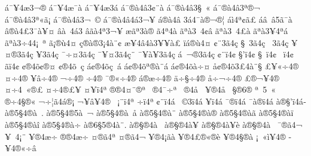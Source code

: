 {^^e1^^af^^a54^^e63^^ac^^ae^^ad
^^e1^^af^^a54^^e6^^af^^e0
^^e1^^af^^a54^^e63^^e1
^^e1^^af^^ae^^e04^^e23^^a2^^a8^^e0
^^e1^^af^^ae^^e04^^e23^^a7^^a0^^ab
^^e1^^af^^ae^^e04^^e23^^aa^^ae^^ac
^^e1^^af^^ae^^e04^^e23^^aa^^ab^^e3^^a1
^^e1^^af^^ae^^e04^^e23^^ac^^a0^^a9
^^e1^^af^^ae^^e04^^e24^^e13^^ac^^a5
^^e1^^ae^^e04^^e2^^ad
3^^e14^^af^^e0^^ae^^ac^^ae^^a6
^^e1^^ec4^^aa^^a2^^e3^^a3
^^e1^^e2^^a0^^e25^^e3^^af^^e0
^^e2^^ae^^e04^^a33^^af^^e0^^a5^^a4
^^e2^^e0^^a0^^ad4^^e13
^^e2^^e3^^e04^^aa3^^ac^^a5^^ad
^^e6^^e3^^aa3^^e0^^ae
^^e34^^aa4^^e0
^^e3^^aa^^e03^^a04^^a2^^e2
^^e3^^aa^^e03^^a04^^a3^^e0
^^e3^^aa^^e03^^a54^^aa^^e1
^^e3^^aa^^e03^^f74^^ad4^^a1^^a0^^ad^^aa 
^^e3^^a1^^ae^^f94^^a4
^^e7^^ae^^e0^^ad^^ae3^^a14^^e0^^a8^^a2
^^e6^^a5^^ad4^^e24^^e03^^a5^^ad^^a5^^e0^^a3
^^ef^^e1^^ae^^f94^^a4
^^a2^^a83^^e34^^e7
^^a7^^a03^^e34^^e7
^^ad^^a03^^e34^^e7
^^ad^^a5^^a4^^ae3^^e34^^e7
^^ad^^a53^^e34^^e7
^^af^^f7^^a43^^e34^^e7
^^af^^a5^^a43^^e34^^e7^^a8
^^af^^a5^^e0^^a53^^e34^^e7
^^e1^^a0^^ac^^ae3^^e34^^e7
^^a2^^a8^^ef4^^a2
^^a7'^^ef4^^a2
^^a7^^a0^^ef4^^a2
^^ad^^a0^^ef4^^a2
^^e3^^ef4^^a2
^^a2^^ae4^^f5^^a2^^ae^^a4
^^a2^^ae4^^f5^^ad^^a0^^e7
^^e1^^a2^^ae4^^f5^^e7^^a0^^e1
^^e1^^a2^^ae4^^f5^^aa^^ae^^e0^^a8^^e1
^^e1^^a2^^ae4^^f5^^e0^^f7^^a4
^^e5^^a2^^ae4^^f53^^a34^^e0^^a8^^a7
^^a3^^a5^^ab^^f74^^ae
^^a4^^f74^^ae
^^a5^^e2^^f74^^ae
^^ac^^f74^^ae
^^f74^^ae^^ad
^^af^^ae^^ab^^f74^^ae
^^e1^^ae^^e6^^f74^^ae
^^e4^^f7^^a7^^f74^^ae
^^e5^^f7^^ac^^f74^^ae
^^a3^^ae^^ac^^a54^^ae
^^a4^^f74^^a0^^ab^^ae^^a3
^^a4^^f74^^ae^^a3^^a5^^ad
^^a4^^a5^^ef4^^aa
^^ae^^ae4^^a4^^a8^^ad^^ae^^aa
^^a0^^ae4^^af^^f7^^aa
^^a0^^ae4^^e5^^a0
^^a5^^ae4^^e5^^a0
^^a7^^ae6^^ae
^^aa^^a05^^ad^^a0^^ab
^^ae^^f74^^a7^^ae^^ab
^^ac^^f7^^a6^^e34^^e1^^ae^^a1
^^ac^^a5^^e2^^a54^^ae
^^a0^^a1^^a8^^ef4^^aa
^^ad^^f7^^ef4^^aa
^^a2^^a8^^ef4^^e1^^ad
^^ad^^a0^^a93^^ef4^^e1^^ad
^^ad^^a5^^ef4^^e1^^ad
^^af^^ae^^ef4^^e1^^ad
^^af^^e0^^ae^^ef4^^e1^^ad
^^e0^^ae^^a7'^^ef4^^e1^^ad
^^e0^^ae5^^a74^^ae^^e0^^a0.    
^^e0^^ae5^^a74^^ae5^^e0^^a0^^ac    
^^e0^^ae5^^a74^^ae^^e0^^a0^^e5    
^^e0^^ae5^^a74^^ae^^e0^^a8     
^^e0^^ae5^^a74^^ae^^e0^^ae     
^^e0^^ae5^^a74^^ae^^e0^^e3     
^^e0^^ae5^^a74^^ae^^e0^^ef     
^^e0^^ae5^^a74^^ae^^e0^^ee     
^^e0^^ae5^^a74^^ae^^e0^^f7     
^^e0^^ae6^^a75^^ae4^^e0^^a8.   
^^e0^^ae^^a7^^ae4^^e0^^a0     
^^e0^^ae^^a7^^ae4^^e0^^a5      
^^e0^^ae^^a7^^ae4^^e0^^a5^^e8     
^^e0^^ae^^a7^^ae4^^e0^^ad
^^ad^^a0^^af^^ae^^e34^^ac
^^ad^^a5^^a04^^a1^^a8      
^^a5^^ae4^^e6^^f7^^ad
^^ae^^ae4^^e6^^f7^^ad
^^a4^^ae^^e34^^aa
^^a4^^ae^^e34^^ac
^^a5^^ae4^^a1^^e3^^e0
^^a5^^ae4^^a3^^ae^^ab^^ae^^e8
^^a5^^ae4^^a7^^ae^^e0
^^a1^^a0^^ab^^ec^^ad^^a54^^ae
^^ad^^a54^^ae^^ab^^f7^^e2
}
